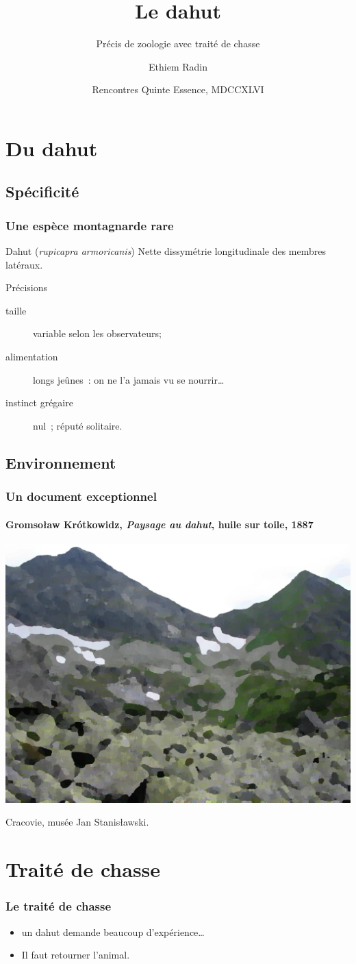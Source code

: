 \documentclass{beamer}
\title{Le dahut}
\subtitle{Précis de zoologie avec traité de chasse}
\author[Radin]{Ethiem Radin}
\institute[Univ. Gévaudan]{UFR de Biologie\\ Université du Gévaudan}
\date[MDCCXLVI]{Rencontres Quinte Essence, MDCCXLVI}
\begin{document}
\begin{frame}
  \titlepage
  \tableofcontents
\end{frame}

\section{Du dahut}
\subsection{Spécificité}

\begin{frame}
  \frametitle{Une espèce montagnarde rare}

  \begin{block}{Dahut (\emph{rupicapra armoricanis})}
     Nette dissymétrie longitudinale des membres latéraux.
  \end{block}
  \begin{exampleblock}{Précisions}
    \begin{description}
       \item[taille] variable selon les observateurs;
       \item[alimentation] longs jeûnes : on ne l’a jamais vu se nourrir…
       \item[instinct grégaire] nul ; réputé solitaire.
    \end{description}
  \end{exampleblock}
\end{frame}

\subsection{Environnement}


\begin{frame}
   \frametitle{Un document exceptionnel}
   \framesubtitle{Gromsoław Krótkowidz, \emph{Paysage au dahut}, huile sur toile, 1887}
   \includegraphics[width=.7\linewidth]{dahut.jpg}

   Cracovie, musée Jan Stanisławski.
\end{frame}

\section{Traité de chasse}

\begin{frame}
   \frametitle{Le traité de chasse}
   
   \begin{itemize}
      \item {} un dahut demande \alert{beaucoup d’expérience}… 
      \item Il faut retourner l’animal.
   \end{itemize}
\end{frame}
\end{document}
